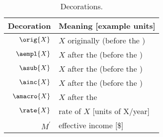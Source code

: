 \begin{table}
\centering %
\caption{Decorations.}
\begin{tabular}{r l}
  \toprule
  Decoration & Meaning [example units] \\
  \midrule
  $\orig{X}$ & $X$ originally (before the \empleffect{}) \\
  $\aempl{X}$  & $X$ after the \empleffect{} (before the \subeffect{}) \\
  $\asub{X}$ & $X$ after the \subeffect{} (before the \inceffect{}) \\
  $\ainc{X}$ & $X$ after the \inceffect{} (before the \macroeffect{}) \\
  $\amacro{X}$ & $X$ after the \macroeffect{} \\
  $\rate{X}$ & rate of $X$ [units of X/year] \\
  $M^\prime$ & effective income [\$] \\
  \bottomrule
\end{tabular}
\label{tab:decorations}
\end{table}



